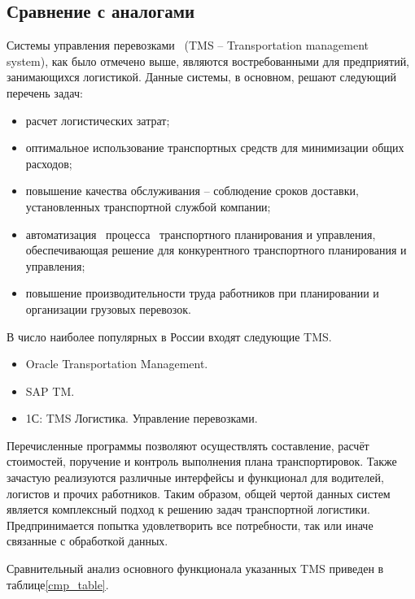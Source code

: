 \subsection{Сравнение с аналогами}
	Системы управления перевозками \, (TMS -- Transportation management \, system), как было отмечено выше, являются востребованными для предприятий, занимающихся логистикой. Данные системы, в основном, решают следующий перечень задач\cite{subj:tms_cmp}:
	\begin{itemize}
		\item расчет логистических затрат;
		\item оптимальное использование транспортных средств для минимизации
		общих расходов;
		\item повышение качества обслуживания -- соблюдение сроков доставки, установленных транспортной службой компании;
		\item автоматизация \, процесса \, транспортного планирования и управления, \, обеспечивающая решение для конкурентного транспортного планирования
		и управления;
		\item повышение производительности труда работников при планировании и
		организации грузовых перевозок.
	\end{itemize}

	\hfill
	
	В число наиболее популярных в России входят следующие TMS.
	\begin{itemize}
		\item Oracle Transportation Management.
		\item SAP TM.
		\item 1С: TMS Логистика. Управление перевозками.
	\end{itemize}

	Перечисленные программы позволяют осуществлять составление, расчёт стоимостей, поручение и контроль выполнения плана транспортировок. Также зачастую реализуются различные интерфейсы и функционал для водителей, логистов и прочих работников. Таким образом, общей чертой данных систем является комплексный подход к решению задач транспортной логистики. Предпринимается попытка удовлетворить все потребности, так или иначе связанные с обработкой данных. 
	
	Сравнительный анализ основного функционала\cite{subj:tms_cmp} указанных TMS приведен в таблице\ref{cmp_table}.
	
